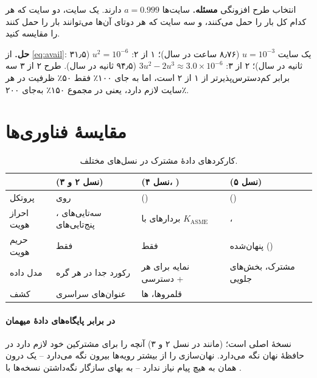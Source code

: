 \documentclass[11pt,a4paper]{article}
\begin{document}
\begin{examplebox}{انتخاب طرح افزونگی}\label{ex:geo}
\textbf{مسئله.} سایت‌ها $a = 0.999$ دارند. یک سایت، دو سایت که هر کدام کل بار را حمل می‌کنند، و سه سایت که هر دوتای
آن‌ها می‌توانند بار را حمل کنند را مقایسه کنید.

\textbf{حل.} از \cref{eq:avail}: یک سایت $u = 10^{-3}$ (۸٫۷۶ ساعت در سال)؛ ۱ از ۲: $u^2 = 10^{-6}$ (۳۱٫۵ ثانیه در سال)؛
۲ از ۳: $3u^2-2u^3 \approx 3.0\times10^{-6}$ (۹۴٫۵ ثانیه در سال). طرح ۲ از ۳ سه برابر کم‌دسترس‌پذیرتر از ۱ از ۲ است، اما به
جای ۱۰۰٪ فقط ۵۰٪ ظرفیت در هر سایت لازم دارد، یعنی در مجموع ۱۵۰٪ به‌جای ۲۰۰٪.
\end{examplebox}

\section{مقایسهٔ فناوری‌ها}
\begin{table}[htbp]
\centering\small
\caption{کارکردهای دادهٔ مشترک در نسل‌های مختلف.}\label{tab:cmp}
\begin{tabularx}{\linewidth}{@{}l Y Y Y@{}}
\toprule
{} &  (نسل ۲ و ۳) &  (نسل ۴، ) &  (نسل ۵) \\
\midrule
پروتکل          &  روی  &  () &  () \\
احراز هویت      & سه‌تایی‌های ، پنج‌تایی‌های  & بردارهای  با $K_{\mathrm{ASME}}$ & ،  \\
حریم هویت       & فقط             & فقط        &  پنهان‌شده () \\
مدل داده        & رکورد جدا در هر گره        & نمایه برای هر دسترسی +  &  مشترک، بخش‌های جلویی  \\
کشف             & عنوان‌های سراسری           & قلمروها، ها     &  \\
\bottomrule
\end{tabularx}
\end{table}

\paragraph{ در برابر پایگاه‌های دادهٔ میهمان}  نسخهٔ اصلی است؛  (مانند  در نسل ۲ و ۳)
آنچه را برای مشترکین خود لازم دارد در حافظهٔ نهان نگه می‌دارد. نهان‌سازی  را از بیشتر رویه‌ها بیرون نگه
می‌دارد -- یک  درون همان  به هیچ پیام  نیاز ندارد -- به بهای سازگار نگه‌داشتن نسخه‌ها با
.
\end{document}
